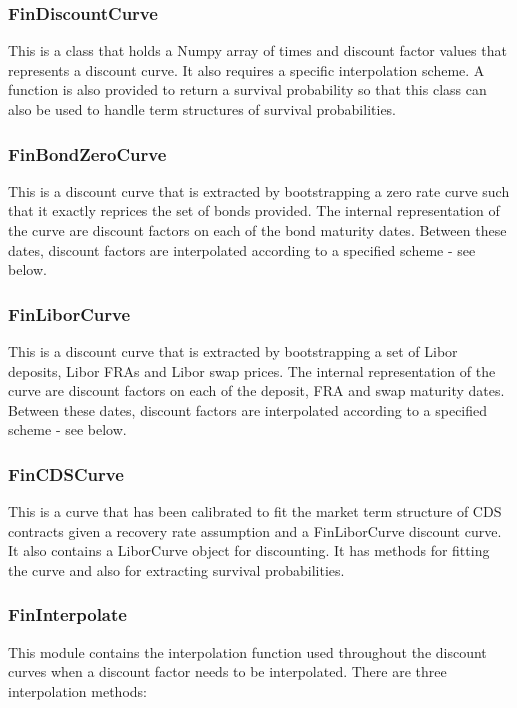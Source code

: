 \documentclass[twoside,11pt]{book}
\begin{document}
\subsubsection*{FinDiscountCurve}
This is a class that holds a Numpy array of times and discount factor values that represents a discount curve. It also requires a specific interpolation scheme. A function is also provided to return a survival probability so that this class can also be used to handle term structures of survival probabilities.


\subsubsection*{FinBondZeroCurve}
This is a discount curve that is extracted by bootstrapping a zero rate curve such that it exactly reprices the set of bonds provided. The internal representation of the curve are discount factors on each of the bond maturity dates. Between these dates, discount factors are interpolated according to a specified scheme - see below.


\subsubsection*{FinLiborCurve}
This is a discount curve that is extracted by bootstrapping a set of Libor deposits, Libor FRAs and Libor swap prices. The internal representation of the curve are discount factors on each of the deposit, FRA and swap maturity dates. Between these dates, discount factors are interpolated according to a specified scheme - see below.


\subsubsection*{FinCDSCurve}
This is a curve that has been calibrated to fit the market term structure of CDS contracts given a recovery rate assumption and a FinLiborCurve discount curve. It also contains a LiborCurve object for discounting. It has methods for fitting the curve and also for extracting survival probabilities.


\subsubsection*{FinInterpolate}
This module contains the interpolation function used throughout the discount curves when a discount factor needs to be interpolated. There are three interpolation methods:
\end{document}
